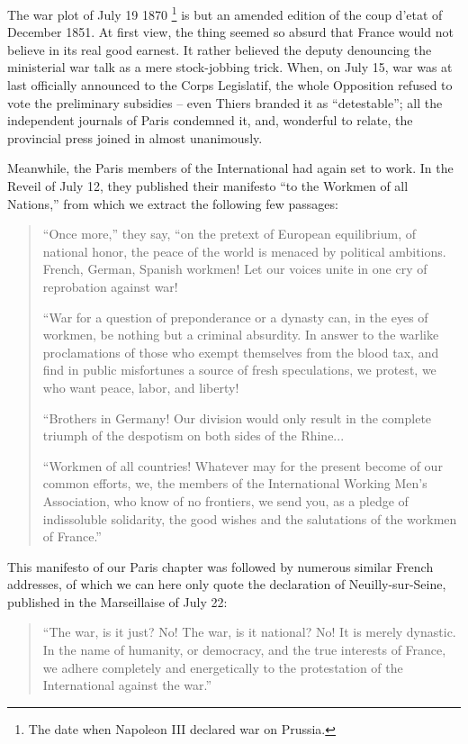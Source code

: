 \documentclass{book}
\begin{document}
The war plot of July 19 1870 \footnote{The date when Napoleon III declared
war on Prussia.} is but an amended edition of the coup d’etat of December
1851. At first view, the thing seemed so absurd that France would not
believe in its real good earnest. It rather believed the deputy denouncing
the ministerial war talk as a mere stock-jobbing trick. When, on July 15,
war was at last officially announced to the Corps Legislatif, the whole
Opposition refused to vote the preliminary subsidies – even Thiers branded
it as “detestable”; all the independent journals of Paris condemned it,
and, wonderful to relate, the provincial press joined in almost
unanimously.

Meanwhile, the Paris members of the International had again set to work.
In the Reveil of July 12, they published their manifesto “to the Workmen
of all Nations,” from which we extract the following few passages:

\begin{quote}

“Once more,” they say, “on the pretext of European equilibrium, of
national honor, the peace of the world is menaced by political ambitions.
French, German, Spanish workmen! Let our voices unite in one cry of
reprobation against war!


``War for a question of preponderance or a dynasty can, in the eyes of
workmen, be nothing but a criminal absurdity. In answer to the warlike
proclamations of those who exempt themselves from the blood tax, and find
in public misfortunes a source of fresh speculations, we protest, we who
want peace, labor, and liberty!

``Brothers in Germany! Our division would only result in the complete
triumph of the despotism on both sides of the Rhine...

``Workmen of all countries! Whatever may for the present become of our
common efforts, we, the members of the International Working Men’s
Association, who know of no frontiers, we send you, as a pledge of
indissoluble solidarity, the good wishes and the salutations of the
workmen of France.”

\end{quote}

This manifesto of our Paris chapter was followed by numerous similar
French addresses, of which we can here only quote the declaration of
Neuilly-sur-Seine, published in the Marseillaise of July 22:

\begin{quote}

``The war, is it just? No! The war, is it national? No! It is merely
dynastic. In the name of humanity, or democracy, and the true interests of
France, we adhere completely and energetically to the protestation of the
International against the war.''

\end{quote}
\end{document}
